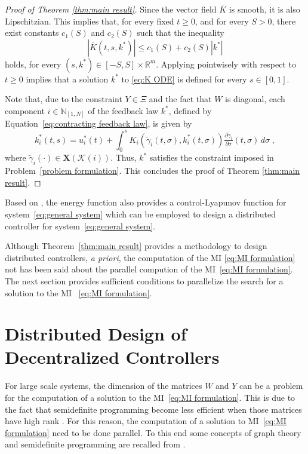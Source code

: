 \documentclass[10pt,twocolumn,twoside]{IEEEtran}
\theoremstyle{plain}
\theoremstyle{definition}
\theoremstyle{remark}
\begin{document}
\begin{proof}[Proof of Theorem \ref{thm:main result}]
	Since the vector field $\overline{K}$ is smooth, it is also Lipschitzian. This implies that, for every fixed $t\geq0$, and for every $S>0$, there exist constants $c_1(S)$ and $c_2(S)$ such that the inequality
	\begin{equation*}
		\left|\overline{K}(t,s,k^\ast)\right|\leq c_1(S)+c_2(S)|k^\ast|
	\end{equation*}
	holds, for every $(s,k^\ast)\in [-S,S]\times\mathbb{R}^m$. Applying \cite[Theorem 2.12]{Teschl2012} pointwisely with respect to $t\geq0$ implies that a solution $k^\ast$ to \eqref{eq:K ODE} is defined for every $s\in[0,1]$.
	
	Note that, due to the constraint $Y\in\Xi$ and the fact that $W$ is diagonal, each component $i\in\mathbb{N}_{[1,N]}$ of the feedback law $k^\ast$, defined by  Equation~\eqref{eq:contracting feedback law}, is given by
	\begin{equation*}
		k_i^\ast(t,s)=u_i^\ast(t)+\int_0^sK_i(\widetilde{\gamma}_i(t,\sigma),k_i^\ast(t,\sigma))\tfrac{\partial\widetilde{\gamma}_i}{\partial \sigma}(t,\sigma)\,d\sigma\;,
	\end{equation*}
	where $\widetilde{\gamma}_i(\cdot)\in\mathbf{X}(\mathscr{K}(i))$.
	Thus, $k^\ast$ satisfies the constraint imposed in Problem~\ref{problem formulation}. This concludes the proof of Theorem \ref{thm:main result}.
\end{proof}

Based on \cite{Manchester2014a}, the energy function also provides a control-Lyapunov function for system~\eqref{eq:general system} which can be employed to design a distributed controller for system~\eqref{eq:general system}.

Although Theorem~\ref{thm:main result} provides a methodology to design distributed controllers, \emph{a priori}, the computation of the MI \eqref{eq:MI formulation} not has been said about the parallel compution of the MI~\eqref{eq:MI formulation}. The next section provides sufficient conditions to parallelize the search for a solution to the MI~ \eqref{eq:MI formulation}.

\section{Distributed Design of Decentralized Controllers}

For large scale systems, the dimension of the matrices $W$ and $Y$ can be a problem for the computation of a solution to the MI~\eqref{eq:MI formulation}. This is due to the fact that semidefinite programming become less efficient when those matrices have high rank \cite{VandenbergheBoyd1996}. For this reason, the computation of a solution to MI~\eqref{eq:MI formulation} need to be done parallel. To this end some concepts of graph theory and semidefinite programming are recalled from \cite{PakazadHanssonAndersenEtAl2015,VandenbergheAndersen2015,BlairPeyton1993}. 
\end{document}
